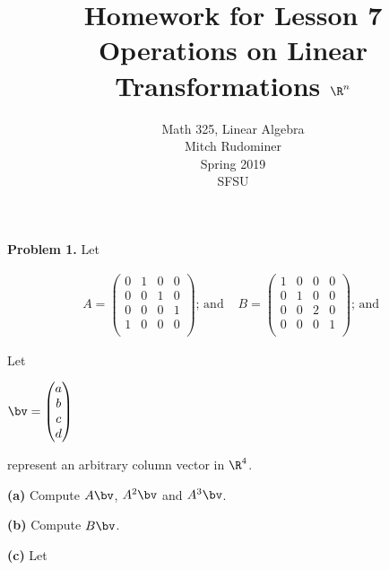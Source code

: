 \documentclass[oneside,12pt]{amsart}
\begin{document}
\title{Homework for Lesson 7 \\ Operations on Linear Transformations $\R^n$}
\author{Math 325, Linear Algebra \\ Mitch Rudominer \\ Spring 2019 \\ SFSU }
\date{}

\maketitle

\textbf{Problem 1.} Let

\smallskip

$$
\begin{matrix}
A = \begin{pmatrix}
0 & 1 & 0 & 0\\
0 & 0 & 1 & 0\\
0 & 0 & 0 & 1\\
1 & 0 & 0 & 0\\
\end{pmatrix}
\text{; and }
&
B = \begin{pmatrix}
1 & 0 & 0 & 0\\
0 & 1 & 0 & 0\\
0 & 0 & 2 & 0\\
0 & 0 & 0 & 1\\
\end{pmatrix}
\text{; and }
\end{matrix}
$$

 Let

\smallskip

$
\bv = \begin{pmatrix}
a \\
b \\
c \\
d \\
\end{pmatrix}
$

represent an arbitrary column vector in $\R^4$.

\smallskip

\textbf{(a)} Compute $A \bv$, $A^2 \bv$ and $A^3 \bv$.

\bigskip
\bigskip
\bigskip
\bigskip
\bigskip
\bigskip

\textbf{(b)} Compute $B \bv$.

\bigskip
\bigskip
\bigskip
\bigskip
\bigskip
\bigskip

\textbf{(c)} Let

\smallskip
\end{document}
